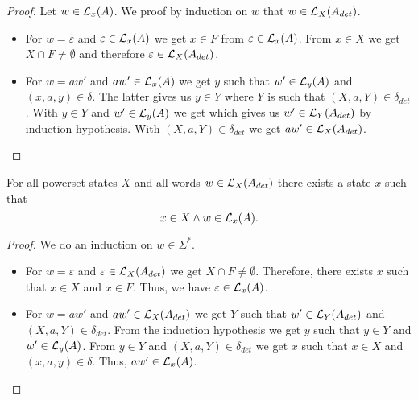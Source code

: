 \begin{proof}
    Let $w \in \mathcal{L}_{x}(A)$. We proof by induction on $w$ that $w \in \mathcal{L}_{X}(A_{det})$. 
    \begin{itemize}
        \item
            For $w = \varepsilon$ and $\varepsilon \in \mathcal{L}_{x}(A)$ we get $x \in F$ from $\varepsilon \in \mathcal{L}_{x}(A)$. 
            From $x \in X$ we get $X \cap F \neq \emptyset$ and therefore $\varepsilon \in \mathcal{L}_{X}(A_{det})$.
        \item
            For $w = a w'$ and $a w' \in \mathcal{L}_{x}(A)$ we get $y$ such that $w' \in \mathcal{L}_{y}(A)$ and $(x,a,y) \in \delta$.
            The latter gives us $y \in Y$ where $Y$ is such that $(X, a, Y) \in \delta_{det}$.
            With $y \in Y$ and $w' \in \mathcal{L}_{y}(A)$ we get 
            which gives us $w' \in \mathcal{L}_{Y}(A_{det})$ by induction hypothesis.
            With $(X, a, Y) \in \delta_{det}$ we get $a w' \in \mathcal{L}_{X}(A_{det})$.
    \end{itemize}
\end{proof}


\begin{lemma}
    \label{nfa_to_dfa_sound}
    For all powerset states $X$ and all words $w \in \mathcal{L}_{X}(A_{det})$ there exists a state $x$ such that 
    \begin{equation*}
        x \in X \wedge
        w \in \mathcal{L}_{x}(A).
    \end{equation*}
\end{lemma}

\begin{proof}
    We do an induction on $w \in \Sigma^*$. %
    \begin{itemize}
        \item
            For $w = \varepsilon$ and $\varepsilon \in \mathcal{L}_{X}(A_{det})$ we get  $X \cap F \neq \emptyset$.
            Therefore, there exists $x$ such that $x \in X$ and $x \in F$.
            Thus, we have $\varepsilon \in \mathcal{L}_{x}(A)$.
        \item
            For $w = a w'$ and $a w' \in \mathcal{L}_{X}(A_{det})$ we get $Y$ such that $w' \in \mathcal{L}_{Y}(A_{det})$ and $(X,a,Y) \in \delta_{det}$.
            From the induction hypothesis we get $y$ such that $y \in Y$ and $w' \in \mathcal{L}_{y}(A)$.
            From $y \in Y$ and $(X, a, Y) \in \delta_{det}$ we get $x$ such that $x \in X$ and $(x, a, y) \in \delta$.
            Thus, $a w' \in \mathcal{L}_{x}(A)$.
    \end{itemize}
\end{proof}

